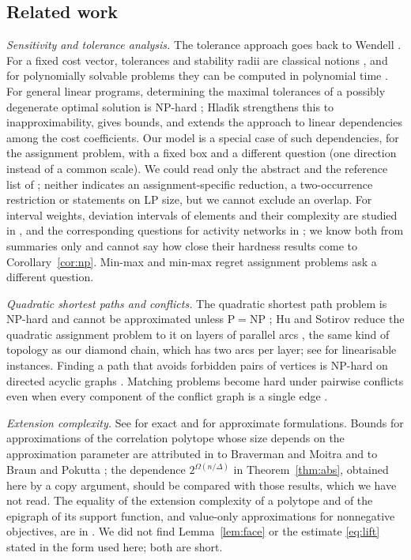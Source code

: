 \documentclass[11pt]{amsart}
\theoremstyle{plain}
\theoremstyle{definition}
\theoremstyle{remark}
\begin{document}
\subsection*{Related work}
\emph{Sensitivity and tolerance analysis.} The tolerance approach goes back to Wendell \cite{Wendell}. For a fixed
cost vector, tolerances and stability radii are classical notions \cite{SLG,LinWen,GJM}, and for polynomially
solvable problems they can be computed in polynomial time \cite{CW}. For general linear programs, determining the maximal tolerances of a possibly degenerate
optimal solution is NP-hard \cite{Hladik11}; Hlad\'{\i}k \cite{Hladik26} strengthens this to inapproximability,
gives bounds, and extends the approach to linear dependencies among the cost coefficients. Our model is a special
case of such dependencies, for the assignment problem, with a fixed box and a different question (one direction
instead of a common scale). We could read only the abstract and the reference list of \cite{Hladik26}; neither
indicates an assignment-specific reduction, a two-occurrence restriction or statements on LP size, but we cannot
exclude an overlap. For interval weights, deviation intervals of elements and their complexity are studied in
\cite{KZ}, and the corresponding questions for activity networks in \cite{Fortin}; we know both from summaries only
and cannot say how close their hardness results come to Corollary~\ref{cor:np}. Min-max and min-max regret
assignment problems \cite{ABV} ask a different question.

\emph{Quadratic shortest paths and conflicts.} The quadratic shortest path problem is NP-hard and cannot be
approximated unless $\mathrm{P}=\mathrm{NP}$ \cite{Rostami}; Hu and Sotirov reduce the quadratic assignment problem
to it on layers of parallel arcs \cite{HuSotirov}, the same kind of topology as our diamond chain, which has two
arcs per layer; see \cite{Cela} for linearisable instances. Finding a path that avoids forbidden pairs of vertices
is NP-hard on directed acyclic graphs \cite{GMO,Kovac}. Matching problems become hard under pairwise conflicts even
when every component of the conflict graph is a single edge \cite{DPSW}.

\emph{Extension complexity.} See \cite{Yannakakis,FMPTW,KW} for exact and \cite{BFPS,CLRS,BPZ} for approximate
formulations. Bounds for approximations of the correlation polytope whose size depends on the approximation
parameter are attributed in \cite[Example~3.10]{BPZ} to Braverman and Moitra \cite{BM} and to Braun and Pokutta
\cite{BP13}; the dependence $2^{\Omega(n/\Delta)}$ in Theorem~\ref{thm:abs}, obtained here by a copy argument, should
be compared with those results, which we have not read. The equality of the extension complexity of a polytope and of the epigraph of its support function,
and value-only approximations for nonnegative objectives, are in \cite{HL}. We did not find Lemma~\ref{lem:face} or
the estimate \eqref{eq:lift} stated in the form used here; both are short.
\end{document}
